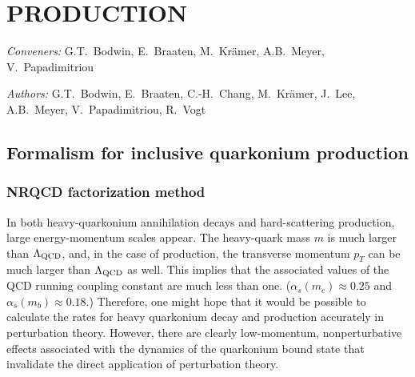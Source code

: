 



%

%
\chapter {PRODUCTION}
\label{chap:V}
{{\it Conveners:} G.T.~Bodwin, E.~Braaten, M.~Kr\"amer, A.B.~Meyer,
V.~Papadimitriou}\par\noindent 
{{\it Authors:} G.T.~Bodwin, E.~Braaten, C.-H.~Chang, M.~Kr\"amer,
J.~Lee, A.B.~Meyer, V.~Papadimitriou, R.~Vogt}
\par\noindent

%
\section{Formalism for inclusive quarkonium production}
\label{prodsec:nrqcd}

\subsection{NRQCD factorization method}
\label{prodsec:nrqcdfact}

In both heavy-quarkonium annihilation decays and hard-scattering
production, large energy-momentum scales appear. The heavy-quark mass
$m$ is much larger than $\Lambda_{\rm QCD}$, and, in the case of
production, the transverse momentum $p_T$ can be much larger than
$\Lambda_{\rm QCD}$ as well. This implies that the associated values of
the QCD running coupling constant are much less than one.
($\alpha_s(m_c)\approx 0.25$ and $\alpha_s(m_b)\approx 0.18$.)
Therefore, one might hope that it would be possible to calculate the
rates for heavy quarkonium decay and production accurately in
perturbation theory. However, there are clearly low-momentum,
nonperturbative effects associated with the dynamics of the quarkonium
bound state that invalidate the direct application of perturbation
theory.

